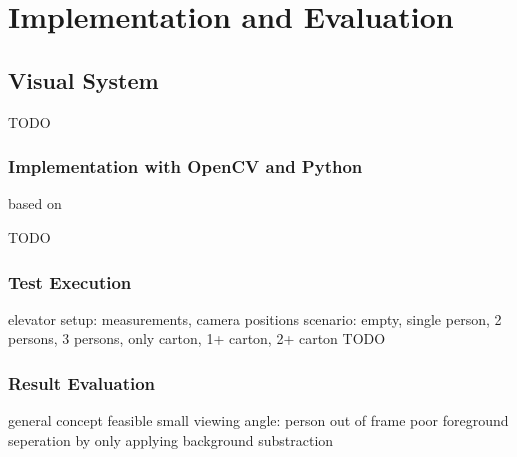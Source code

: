 \chapter{Implementation and Evaluation}
\label{chap:impl}


\section{Visual System}
TODO
\subsection{Implementation with OpenCV and Python}

based on \autocite[][]{xocoatzin2013voxelcarving}

TODO
\subsection{Test Execution}
elevator setup: measurements, camera positions
scenario: empty, single person, 2 persons, 3 persons, only carton, 1+ carton, 2+ carton
TODO
\subsection{Result Evaluation}
general concept feasible
small viewing angle: person out of frame
poor foreground seperation by only applying background substraction

